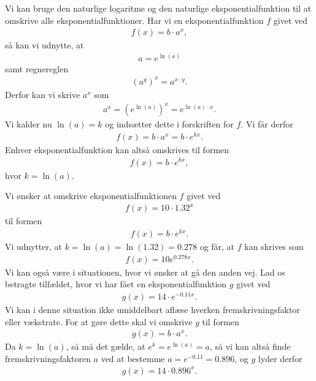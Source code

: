 Vi kan bruge den naturlige logaritme og den naturlige eksponentialfunktion til at omskrive alle eksponentialfunktioner.
Har vi en eksponentialfunktion $f$ givet ved
\begin{align*}
	f(x) = b\cdot a^x,
\end{align*}
så kan vi udnytte, at 
\begin{align*}
	a = e^{\ln(a)}
\end{align*}
samt regnereglen 
\begin{align*}
	(a^{y})^x = a^{x\cdot y}.
\end{align*}
Derfor kan vi skrive $a^x$ som
\begin{align*}
	a^x = (e^{\ln(a)})^x = e^{\ln(a)\cdot x}.
\end{align*}
Vi kalder nu $\ln(a) = k$ og indsætter dette i forskriften for $f$. Vi får derfor
\begin{align*}
	f(x) = b\cdot a^x = b\cdot e^{kx}.
\end{align*}
Enhver eksponentialfunktion kan altså omskrives til formen 
\begin{align*}
	f(x) = b\cdot e^{kx},
\end{align*}
hvor $k = \ln(a)$.

\begin{exa}
	Vi ønsker at omskrive eksponentialfunktionen $f$ givet ved
	\begin{align*}
		f(x) = 10\cdot 1.32^x
	\end{align*}
	til formen 
	\begin{align*}
		f(x) = b\cdot e^{kx}.
	\end{align*}
	Vi udnytter, at $k = \ln(a) = \ln(1.32) = 0.278$ og får, at $f$ kan skrives som
	\begin{align*}
		f(x) = 10e^{0.278x}.
	\end{align*}
	Vi kan også være i situationen, hvor vi ønsker at gå den anden vej. Lad os betragte tilfældet, hvor vi har
	fået en eksponentialfunktion $g$ givet ved
	\begin{align*}
		g(x) = 14\cdot e^{-0.11x}.
	\end{align*}		
	Vi kan i denne situation ikke umiddelbart aflæse hverken fremskrivningsfaktor eller vækstrate. For at gøre 
	dette skal vi omskrive $g$ til formen
	\begin{align*}
		g(x) = b\cdot a^x.
	\end{align*}
	Da $k = \ln(a)$, så må det gælde, at $e^k = e^{\ln(a)} = a$, så vi kan altså finde fremskrivningsfaktoren
	$a$ ved at bestemme $a = e^{-0.11} = 0.896$, og $g$ lyder derfor
	\begin{align*}
		g(x) = 14\cdot 0.896^x.
	\end{align*}	
\end{exa} 

